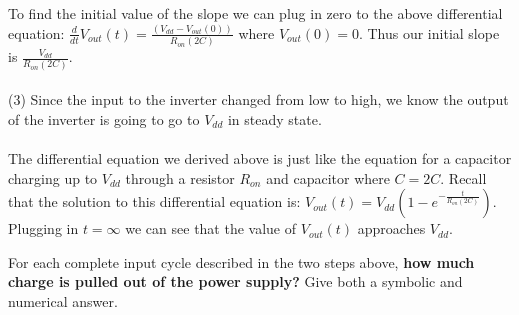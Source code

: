 \begin{enumerate}
{To find the initial value of the slope we can plug in zero to the above differential equation: $\frac {d}{dt} V_{out} (t) = \frac {(V_{dd} - V_{out} (0))}{R_{on} (2C)}$ where $V_{out} (0) = 0$.
Thus our initial slope is $\frac {V_{dd}} {R_{on} (2C)}$.
\\
\\
(3) Since the input to the inverter changed from low to high, we know the output of the inverter is going to go to $V_{dd}$ in steady state.
\\
\\
The differential equation we derived above is just like the equation for a capacitor charging up to $V_{dd}$ through a resistor $R_{on}$ and capacitor where $C = 2C$.
Recall that the solution to this differential equation is: $V_{out}(t) = V_{dd}(1 - e^{- \frac {t}{R_{on} (2C)}})$.
Plugging in $t = \infty$ we can see that the value of $V_{out}(t)$ approaches $V_{dd}$.

  
}


\qitem For each complete input cycle described in the two steps above, \textbf{how much charge is pulled out of the power supply?}
Give both a symbolic and numerical answer.


\end{enumerate}

